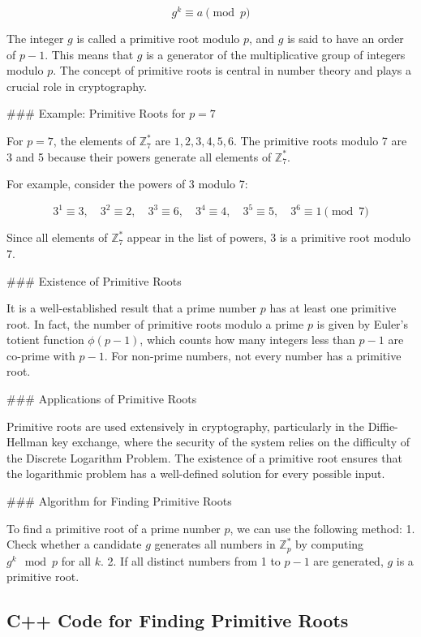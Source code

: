 \documentclass[10pt,a4paper]{article}
\begin{document}
\[
g^k \equiv a \pmod{p}
\]

The integer \(g\) is called a primitive root modulo \(p\), and \(g\) is said to have an order of \(p-1\). This means that \(g\) is a generator of the multiplicative group of integers modulo \(p\). The concept of primitive roots is central in number theory and plays a crucial role in cryptography.

### Example: Primitive Roots for \(p = 7\)

For \(p = 7\), the elements of \( \mathbb{Z}_7^* \) are \(1, 2, 3, 4, 5, 6\). The primitive roots modulo 7 are 3 and 5 because their powers generate all elements of \( \mathbb{Z}_7^* \).

For example, consider the powers of 3 modulo 7:

\[
3^1 \equiv 3, \quad 3^2 \equiv 2, \quad 3^3 \equiv 6, \quad 3^4 \equiv 4, \quad 3^5 \equiv 5, \quad 3^6 \equiv 1 \pmod{7}
\]

Since all elements of \( \mathbb{Z}_7^* \) appear in the list of powers, 3 is a primitive root modulo 7.

### Existence of Primitive Roots

It is a well-established result that a prime number \(p\) has at least one primitive root. In fact, the number of primitive roots modulo a prime \(p\) is given by Euler's totient function \(\phi(p-1)\), which counts how many integers less than \(p-1\) are co-prime with \(p-1\). For non-prime numbers, not every number has a primitive root.

### Applications of Primitive Roots

Primitive roots are used extensively in cryptography, particularly in the Diffie-Hellman key exchange, where the security of the system relies on the difficulty of the Discrete Logarithm Problem. The existence of a primitive root ensures that the logarithmic problem has a well-defined solution for every possible input.

### Algorithm for Finding Primitive Roots

To find a primitive root of a prime number \(p\), we can use the following method:
1. Check whether a candidate \(g\) generates all numbers in \( \mathbb{Z}_p^* \) by computing \(g^k \mod p\) for all \(k\).
2. If all distinct numbers from 1 to \(p-1\) are generated, \(g\) is a primitive root.

\subsection*{C++ Code for Finding Primitive Roots}
\end{document}
